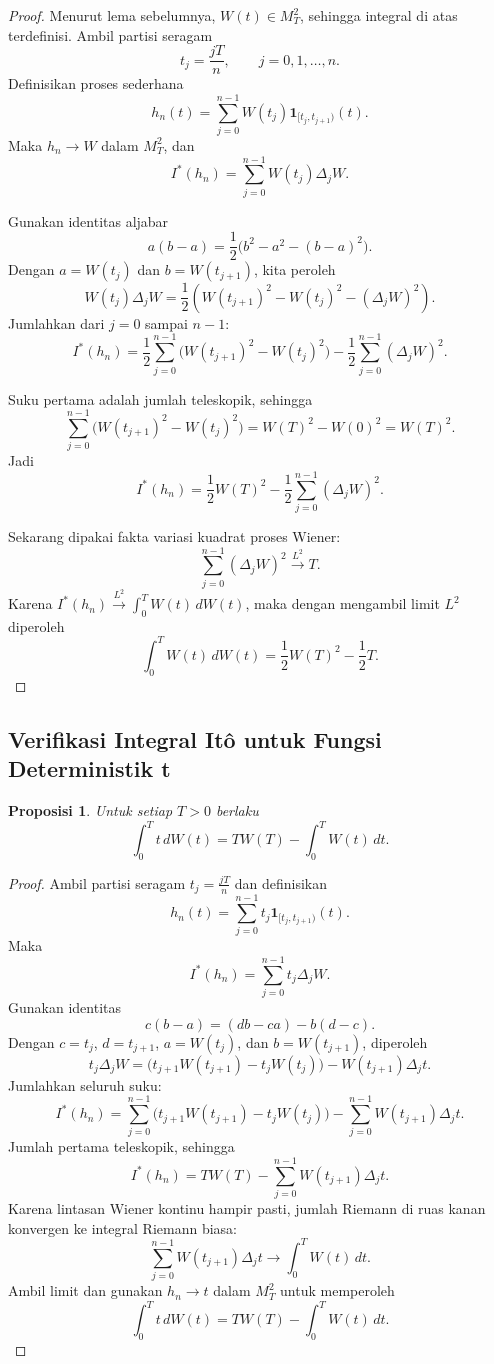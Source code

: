 \documentclass[12pt,a4paper]{article}
\theoremstyle{definition}
\theoremstyle{plain}
\newtheorem{proposisi}[definisi]{Proposisi}
\newcommand{\ind}{\mathbf{1}}
\begin{document}
\begin{proof}
  Menurut lema sebelumnya, $W(t)\in M_T^2$, sehingga integral di atas
  terdefinisi. Ambil partisi seragam
  \[
    t_j=\frac{jT}{n},
    \qquad
    j=0,1,\ldots,n.
  \]
  Definisikan proses sederhana
  \[
    h_n(t)=\sum_{j=0}^{n-1}W(t_j)\ind_{[t_j,t_{j+1})}(t).
  \]
  Maka $h_n\to W$ dalam $M_T^2$, dan
  \[
    I^\ast(h_n)=\sum_{j=0}^{n-1}W(t_j)\Delta_jW.
  \]

  Gunakan identitas aljabar
  \[
    a(b-a)=\frac12\bigl(b^2-a^2-(b-a)^2\bigr).
  \]
  Dengan $a=W(t_j)$ dan $b=W(t_{j+1})$, kita peroleh
  \[
    W(t_j)\Delta_jW
    =
    \frac12\left(
    W(t_{j+1})^2-W(t_j)^2-(\Delta_jW)^2
    \right).
  \]
  Jumlahkan dari $j=0$ sampai $n-1$:
  \[
    I^\ast(h_n)
    =
    \frac12\sum_{j=0}^{n-1}\bigl(W(t_{j+1})^2-W(t_j)^2\bigr)
    -
    \frac12\sum_{j=0}^{n-1}(\Delta_jW)^2.
  \]

  Suku pertama adalah jumlah teleskopik, sehingga
  \[
    \sum_{j=0}^{n-1}\bigl(W(t_{j+1})^2-W(t_j)^2\bigr)
    =
    W(T)^2-W(0)^2
    =
    W(T)^2.
  \]
  Jadi
  \[
    I^\ast(h_n)
    =
    \frac12W(T)^2-\frac12\sum_{j=0}^{n-1}(\Delta_jW)^2.
  \]

  Sekarang dipakai fakta variasi kuadrat proses Wiener:
  \[
    \sum_{j=0}^{n-1}(\Delta_jW)^2\xrightarrow{L^2}T.
  \]
  Karena $I^\ast(h_n)\xrightarrow{L^2}\int_0^T W(t)\,dW(t)$, maka dengan
  mengambil limit $L^2$ diperoleh
  \[
    \int_0^T W(t)\,dW(t)
    =
    \frac12W(T)^2-\frac12T.
  \]
\end{proof}

\subsection{Verifikasi Integral It\^o untuk Fungsi Deterministik t}

\begin{proposisi}
  Untuk setiap $T>0$ berlaku
  \[
    \int_0^T t\,dW(t)=TW(T)-\int_0^T W(t)\,dt.
  \]
\end{proposisi}

\begin{proof}
  Ambil partisi seragam $t_j=\frac{jT}{n}$ dan definisikan
  \[
    h_n(t)=\sum_{j=0}^{n-1} t_j\ind_{[t_j,t_{j+1})}(t).
  \]
  Maka
  \[
    I^\ast(h_n)=\sum_{j=0}^{n-1} t_j\Delta_jW.
  \]
  Gunakan identitas
  \[
    c(b-a)=(db-ca)-b(d-c).
  \]
  Dengan $c=t_j$, $d=t_{j+1}$, $a=W(t_j)$, dan $b=W(t_{j+1})$, diperoleh
  \[
    t_j\Delta_jW
    =
    \bigl(t_{j+1}W(t_{j+1})-t_jW(t_j)\bigr)-W(t_{j+1})\Delta_jt.
  \]
  Jumlahkan seluruh suku:
  \[
    I^\ast(h_n)
    =
    \sum_{j=0}^{n-1}\bigl(t_{j+1}W(t_{j+1})-t_jW(t_j)\bigr)
    -
    \sum_{j=0}^{n-1}W(t_{j+1})\Delta_jt.
  \]
  Jumlah pertama teleskopik, sehingga
  \[
    I^\ast(h_n)=TW(T)-\sum_{j=0}^{n-1}W(t_{j+1})\Delta_jt.
  \]
  Karena lintasan Wiener kontinu hampir pasti, jumlah Riemann di ruas kanan
  konvergen ke integral Riemann biasa:
  \[
    \sum_{j=0}^{n-1}W(t_{j+1})\Delta_jt\to \int_0^T W(t)\,dt.
  \]
  Ambil limit dan gunakan $h_n\to t$ dalam $M_T^2$ untuk memperoleh
  \[
    \int_0^T t\,dW(t)=TW(T)-\int_0^T W(t)\,dt.
  \]
\end{proof}
\end{document}
